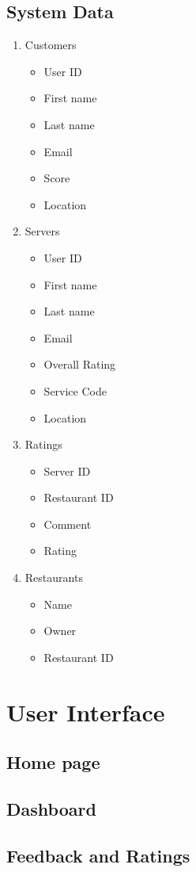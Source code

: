 \documentclass{scrreprt}
\begin{document}
\section{System Data}
\begin{enumerate}
	\item Customers
	\begin{itemize}
		\item User ID
		\item First name
		\item Last name
		\item Email
		\item Score
		\item Location
	\end{itemize}
	\item Servers
	\begin{itemize}
		\item User ID
		\item First name
		\item Last name
		\item Email
		\item Overall Rating
		\item Service Code
		\item Location
	\end{itemize}
	\item Ratings
	\begin{itemize}
		\item Server ID
		\item Restaurant ID
		\item Comment
		\item Rating
	\end{itemize}
	\item Restaurants
	\begin{itemize}
		\item Name
		\item Owner
		\item Restaurant ID
	\end{itemize}
\end{enumerate}

\chapter{User Interface}

\section {Home page}

\section {Dashboard}

\section {Feedback and Ratings}
\end{document}
